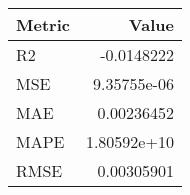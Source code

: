 \begin{tabular}{lr}
\hline
 Metric   &        Value \\
\hline
 R2       & -0.0148222   \\
 MSE      &  9.35755e-06 \\
 MAE      &  0.00236452  \\
 MAPE     &  1.80592e+10 \\
 RMSE     &  0.00305901  \\
\hline
\end{tabular}